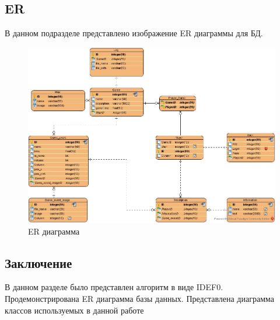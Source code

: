 \subsection{ER}

	В данном подразделе представлено изображение ER диаграммы для БД.
	
	\begin{figure}[H]
		\centering
		\includegraphics[width=0.7\linewidth]{src/ER}
		\caption{ER диаграмма}
		\label{fig:er}
	\end{figure}
	
\subsection{Заключение}
	В данном разделе было представлен алгоритм в виде IDEF0. Продемонстрирована ER диаграмма базы данных. Представлена диаграмма классов используемых в данной работе
	